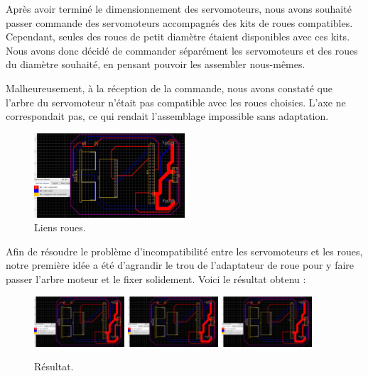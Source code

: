 \documentclass[a4paper,12pt]{report}  %
\begin{document}
Après avoir terminé le dimensionnement des servomoteurs, nous avons souhaité passer commande des servomoteurs accompagnés des kits de roues compatibles. Cependant, seules des roues de petit diamètre étaient disponibles avec ces kits. Nous avons donc décidé de commander séparément les servomoteurs et des roues du diamètre souhaité, en pensant pouvoir les assembler nous-mêmes.

Malheureusement, à la réception de la commande, nous avons constaté que l’arbre du servomoteur n’était pas compatible avec les roues choisies. L’axe ne correspondait pas, ce qui rendait l’assemblage impossible sans adaptation.

\begin{figure}[H]
	\centering
	\includegraphics[width=0.5\textwidth]{./attachments/schema_pcb.jpg}
	\caption{Liens roues.}
\end{figure}

Afin de résoudre le problème d’incompatibilité entre les servomoteurs et les roues, notre première idée a été d’agrandir le trou de l’adaptateur de roue pour y faire passer l’arbre moteur et le fixer solidement. Voici le résultat obtenu :

\begin{figure}[H]
	\centering
	\includegraphics[width=0.3\textwidth]{./attachments/schema_pcb.jpg}
	\includegraphics[width=0.3\textwidth]{./attachments/schema_pcb.jpg}
	\includegraphics[width=0.3\textwidth]{./attachments/schema_pcb.jpg}
	\caption{Résultat.}
\end{figure}
\end{document}
